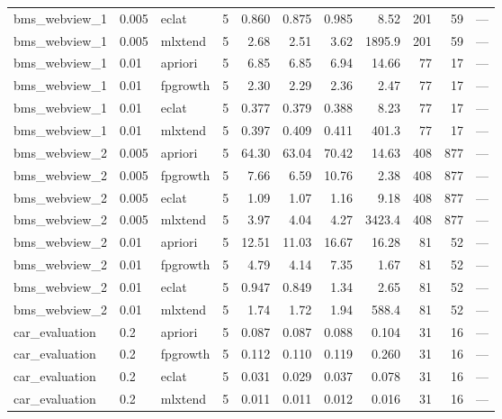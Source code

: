 \documentclass[twocolumn,10pt]{article}
\begin{document}
\begin{longtable}{p{3.0cm}llrrrrrrrp{2.4cm}}
bms\_\allowbreak{}webview\_\allowbreak{}1 & 0.005 & eclat & 5 & 0.860 & 0.875 & 0.985 & 8.52 & 201 & 59 & --- \\
bms\_\allowbreak{}webview\_\allowbreak{}1 & 0.005 & mlxtend & 5 & 2.68 & 2.51 & 3.62 & 1895.9 & 201 & 59 & --- \\
bms\_\allowbreak{}webview\_\allowbreak{}1 & 0.01 & apriori & 5 & 6.85 & 6.85 & 6.94 & 14.66 & 77 & 17 & --- \\
bms\_\allowbreak{}webview\_\allowbreak{}1 & 0.01 & fpgrowth & 5 & 2.30 & 2.29 & 2.36 & 2.47 & 77 & 17 & --- \\
bms\_\allowbreak{}webview\_\allowbreak{}1 & 0.01 & eclat & 5 & 0.377 & 0.379 & 0.388 & 8.23 & 77 & 17 & --- \\
bms\_\allowbreak{}webview\_\allowbreak{}1 & 0.01 & mlxtend & 5 & 0.397 & 0.409 & 0.411 & 401.3 & 77 & 17 & --- \\
bms\_\allowbreak{}webview\_\allowbreak{}2 & 0.005 & apriori & 5 & 64.30 & 63.04 & 70.42 & 14.63 & 408 & 877 & --- \\
bms\_\allowbreak{}webview\_\allowbreak{}2 & 0.005 & fpgrowth & 5 & 7.66 & 6.59 & 10.76 & 2.38 & 408 & 877 & --- \\
bms\_\allowbreak{}webview\_\allowbreak{}2 & 0.005 & eclat & 5 & 1.09 & 1.07 & 1.16 & 9.18 & 408 & 877 & --- \\
bms\_\allowbreak{}webview\_\allowbreak{}2 & 0.005 & mlxtend & 5 & 3.97 & 4.04 & 4.27 & 3423.4 & 408 & 877 & --- \\
bms\_\allowbreak{}webview\_\allowbreak{}2 & 0.01 & apriori & 5 & 12.51 & 11.03 & 16.67 & 16.28 & 81 & 52 & --- \\
bms\_\allowbreak{}webview\_\allowbreak{}2 & 0.01 & fpgrowth & 5 & 4.79 & 4.14 & 7.35 & 1.67 & 81 & 52 & --- \\
bms\_\allowbreak{}webview\_\allowbreak{}2 & 0.01 & eclat & 5 & 0.947 & 0.849 & 1.34 & 2.65 & 81 & 52 & --- \\
bms\_\allowbreak{}webview\_\allowbreak{}2 & 0.01 & mlxtend & 5 & 1.74 & 1.72 & 1.94 & 588.4 & 81 & 52 & --- \\
car\_\allowbreak{}evaluation & 0.2 & apriori & 5 & 0.087 & 0.087 & 0.088 & 0.104 & 31 & 16 & --- \\
car\_\allowbreak{}evaluation & 0.2 & fpgrowth & 5 & 0.112 & 0.110 & 0.119 & 0.260 & 31 & 16 & --- \\
car\_\allowbreak{}evaluation & 0.2 & eclat & 5 & 0.031 & 0.029 & 0.037 & 0.078 & 31 & 16 & --- \\
car\_\allowbreak{}evaluation & 0.2 & mlxtend & 5 & 0.011 & 0.011 & 0.012 & 0.016 & 31 & 16 & --- \\

\end{longtable}
\end{document}
